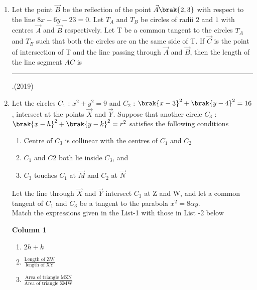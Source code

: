 \begin{enumerate}
\item Let the point $\vec{B}$ be the reflection of the point $\vec{A}\brak{2, 3}$ with respect to the line $8x-6y-23=0$. Let $T_A$ and $T_B$ be circles of radii $2$ and $1$ with centres $\vec{A}$ and $\vec{B}$ respectively. Let T be a common tangent to the circles $T_A$ and $T_B$ such that both the circles are on the same side of T. If $\vec{C}$ is the point of intersection of T and the line passing through $\vec{A}$ and $\vec{B}$, then the length of the line segment $AC$ is  \rule{1cm}{0.01pt}.\hfill(2019)
    \item Let the circles $C_{1}$ : $x^2+y^2=9$ and $C_{2}$ : $\brak{x-3}^2+\brak{y-4}^2 = 16$,  intersect at the points $\vec{X}$ and $\vec{Y}$. Suppose that another circle $C_{3}$ : $\brak{x-h}^2+\brak{y-k}^2=r^2$ satisfies the following conditions
%
%
\begin{multicols}{2}
\begin{enumerate}[label=(\roman*)]
 \item Centre of $C_{3}$ is collinear with the centres of $C_{1}$ and $C_{2}$
 \item $C_{1}$ and $C{2}$ both lie inside $C_{3}$,  and
%
 \item $C_{3}$ touches $C_{1}$ at $\vec{M}$ and $C_{2}$ at  $\vec{N}$ 
\end{enumerate}
\end{multicols}
Let the line through $\vec{X}$ and $\vec{Y}$ intersect $C_{3}$ at Z and W,  and let a common tangent of $C_{1}$ and $C_{3}$ be a tangent to the parabola $x^2=8\alpha y.$\\ %
Match the expressions given in the List-1 with those in List -2 below
%
\begin{multicols}{2}
\textbf{Column 1}
\begin{multicols}{2}
\begin{multicols}{2}
\begin{enumerate}[label=(\Alph*)]           
\item $2h+k$                                  
\item $\frac{\text{Length of ZW}}{\text{length of XY}}$     
\item $\frac{\text{Area of triangle MZN}}{\text{Area of triangle ZMW}}$                     
\end{enumerate}
\end{multicols}
\end{multicols}

\end{multicols}
\end{enumerate}

